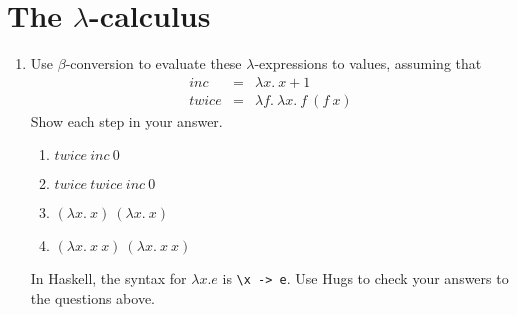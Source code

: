 \documentclass{article}
\begin{document}
\section{The $\lambda$-calculus\protect{}}
\begin{enumerate}
\item Use $\beta$-conversion to evaluate these $\lambda$-expressions
  to values, assuming that 
\begin{eqnarray*}
\mathit{inc}&=&\lambda x.~x+1\\
\mathit{twice}&=&\lambda f.~\lambda x.~f~(f~x)
\end{eqnarray*}
Show each step in your answer.
\begin{enumerate}
\item $\mathit{twice}~\mathit{inc}~0$ 
\item $\mathit{twice}~\mathit{twice}~\mathit{inc}~0$ 
\item $(\lambda x.~x)~(\lambda x.~x)$ 
\item $(\lambda x.~x~x)~(\lambda x.~x~x)$ 
\end{enumerate}
In Haskell, the syntax for $\lambda x.e$ is \verb!\x -> e!. Use Hugs
to check your answers to the questions above.


\end{enumerate}
\end{document}

